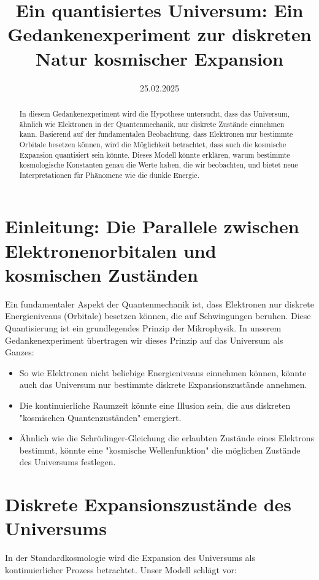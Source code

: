\documentclass[12pt,a4paper]{article}
\title{Ein quantisiertes Universum: Ein Gedankenexperiment zur diskreten Natur kosmischer Expansion}
\author{}
\date{25.02.2025}
\begin{document}
	
	\maketitle
	
	\begin{abstract}
		In diesem Gedankenexperiment wird die Hypothese untersucht, dass das Universum, ähnlich wie Elektronen in der Quantenmechanik, nur diskrete Zustände einnehmen kann. Basierend auf der fundamentalen Beobachtung, dass Elektronen nur bestimmte Orbitale besetzen können, wird die Möglichkeit betrachtet, dass auch die kosmische Expansion quantisiert sein könnte. Dieses Modell könnte erklären, warum bestimmte kosmologische Konstanten genau die Werte haben, die wir beobachten, und bietet neue Interpretationen für Phänomene wie die dunkle Energie.
	\end{abstract}
	
	\section{Einleitung: Die Parallele zwischen Elektronenorbitalen und kosmischen Zuständen}
	
	Ein fundamentaler Aspekt der Quantenmechanik ist, dass Elektronen nur diskrete Energieniveaus (Orbitale) besetzen können, die auf Schwingungen beruhen. Diese Quantisierung ist ein grundlegendes Prinzip der Mikrophysik. In unserem Gedankenexperiment übertragen wir dieses Prinzip auf das Universum als Ganzes:
	
	\begin{itemize}
		\item So wie Elektronen nicht beliebige Energieniveaus einnehmen können, könnte auch das Universum nur bestimmte diskrete Expansionszustände annehmen.
		\item Die kontinuierliche Raumzeit könnte eine Illusion sein, die aus diskreten "kosmischen Quantenzuständen" emergiert.
		\item Ähnlich wie die Schrödinger-Gleichung die erlaubten Zustände eines Elektrons bestimmt, könnte eine "kosmische Wellenfunktion" die möglichen Zustände des Universums festlegen.
	\end{itemize}
	
	\section{Diskrete Expansionszustände des Universums}
	
	In der Standardkosmologie wird die Expansion des Universums als kontinuierlicher Prozess betrachtet. Unser Modell schlägt vor:
	
\end{document}
